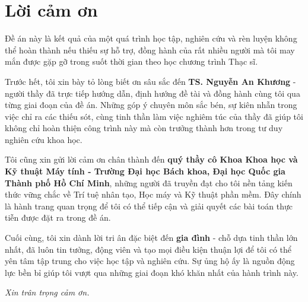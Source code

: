 \cleardoublepage
{}
{}
\chapter*{Lời cảm ơn}

Đề án này là kết quả của một quá trình học tập, nghiên cứu và rèn luyện không thể hoàn thành nếu thiếu sự hỗ trợ, đồng hành của rất nhiều người mà tôi may mắn được gặp gỡ trong suốt thời gian theo học chương trình Thạc sĩ.

Trước hết, tôi xin bày tỏ lòng biết ơn sâu sắc đến \textbf{TS. Nguyễn An Khương} - người thầy đã trực tiếp hướng dẫn, định hướng đề tài và đồng hành cùng tôi qua từng giai đoạn của đề án. Những góp ý chuyên môn sắc bén, sự kiên nhẫn trong việc chỉ ra các thiếu sót, cùng tinh thần làm việc nghiêm túc của thầy đã giúp tôi không chỉ hoàn thiện công trình này mà còn trưởng thành hơn trong tư duy nghiên cứu khoa học.

Tôi cũng xin gửi lời cảm ơn chân thành đến \textbf{quý thầy cô Khoa Khoa học và Kỹ thuật Máy tính - Trường Đại học Bách khoa, Đại học Quốc gia Thành phố Hồ Chí Minh}, những người đã truyền đạt cho tôi nền tảng kiến thức vững chắc về Trí tuệ nhân tạo, Học máy và Kỹ thuật phần mềm. Đây chính là hành trang quan trọng để tôi có thể tiếp cận và giải quyết các bài toán thực tiễn được đặt ra trong đề án.

Cuối cùng, tôi xin dành lời tri ân đặc biệt đến \textbf{gia đình} - chỗ dựa tinh thần lớn nhất, đã luôn tin tưởng, động viên và tạo mọi điều kiện thuận lợi để tôi có thể yên tâm tập trung cho việc học tập và nghiên cứu. Sự ủng hộ ấy là nguồn động lực bền bỉ giúp tôi vượt qua những giai đoạn khó khăn nhất của hành trình này.

\vspace{1em}

\begin{flushright}
\textit{Xin trân trọng cảm ơn.}
\end{flushright}
